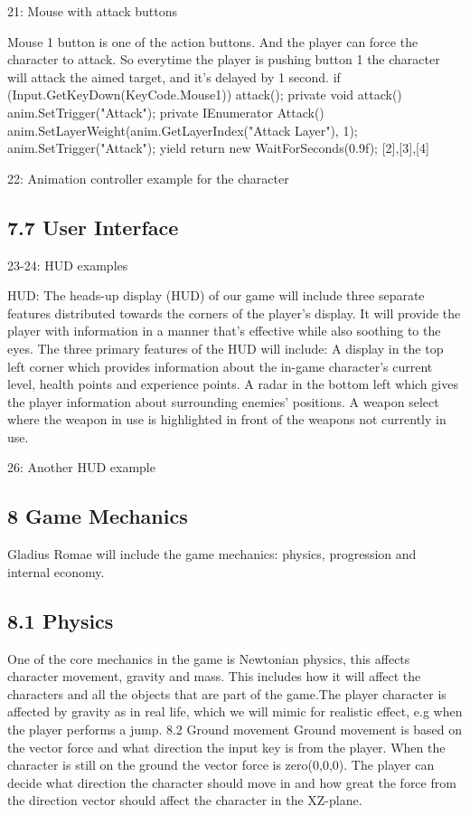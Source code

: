 \documentclass{article}
\begin{document}
\begin{titlepage}
{21: Mouse with attack buttons

Mouse 1 button is one of the action buttons. And the player can force the character to attack. So everytime the player is pushing button 1 the character will attack the aimed target, and it’s delayed by 1 second. 
        if (Input.GetKeyDown(KeyCode.Mouse1))
        {
            attack();
        }
    private void attack()
    {
        anim.SetTrigger("Attack");
    }
    private IEnumerator Attack()
    {
        anim.SetLayerWeight(anim.GetLayerIndex("Attack Layer"), 1);
        anim.SetTrigger("Attack");
        yield return new WaitForSeconds(0.9f);
    }
[2],[3],[4]

22: Animation controller example for the character
\subsection{ 7.7 User Interface }


23-24: HUD examples

HUD: The heads-up display (HUD) of our game will include three separate features distributed towards the corners of the player’s display. It will provide the player with information in a manner that’s effective while also soothing to the eyes. The three primary features of the HUD will include: 
A display in the top left corner which provides information about the in-game character’s current level, health points and experience points. 
A radar in the bottom left which gives the player information about surrounding enemies’ positions. 
A weapon select where the weapon in use is highlighted in front of the weapons not currently in use. 

26: Another HUD example





\subsection{ 8 Game Mechanics }
Gladius Romae will include the game mechanics: physics, progression and internal economy. 

\subsection{ 8.1 Physics }
One of the core mechanics in the game is Newtonian physics, this affects character movement, gravity and mass. This includes how it will affect the characters and all the objects that are part of the game.The player character is affected by gravity as in real life, which we will mimic for realistic effect, e.g when the player performs a jump.
8.2 Ground movement 
Ground movement is based on the vector force and what direction the input key is from the player. When the character is still on the ground the vector force is zero(0,0,0). The player can decide what direction the character should move in and how great the force from the direction vector should affect the character in the XZ-plane. 



}
\end{titlepage}
\end{document}
